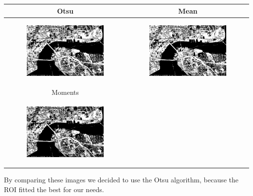 \documentclass[11pt,a4paper]{scartcle}
\begin{document}
\begin{tabular}{|c|c|}
	\hline
	Otsu &  Mean\\
	\hline
	\begin{figure}
		\centering
		\includegraphics[width=0.5\linewidth]{./img/Otsu.jpg}
	\end{figure} &  \begin{figure}
	\centering
	\includegraphics[width=0.5\linewidth]{./img/mean.jpg}
\end{figure}\\
	\hline
	Moments &  \\
	\hline
	\begin{figure}
		\centering
		\includegraphics[width=0.5\linewidth]{./img/moments.jpg}
	\end{figure} &  \\
	\hline
\end{tabular}

By comparing these images we decided to use the Otsu algorithm, because the ROI fitted the best for our needs.
\end{document}
